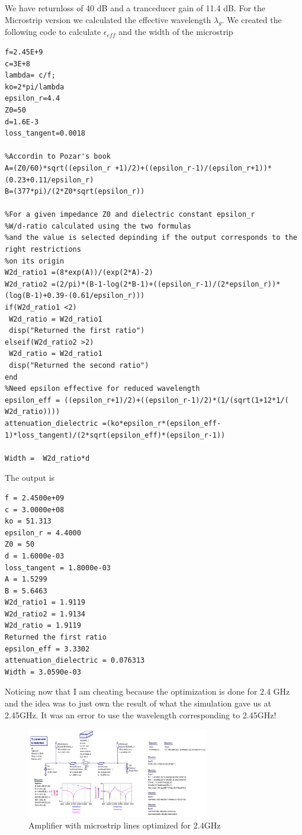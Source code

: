 \documentclass{article}
\begin{document}
We have returnloss of 40 dB and a tranceducer gain of 11.4 dB.
For the Microstrip version we calculated the effective
wavelength $\lambda_g$. We created the following code
to calculate $\epsilon_{eff}$ and the width of the microstrip
\begin{verbatim}
f=2.45E+9
c=3E+8
lambda= c/f;
ko=2*pi/lambda
epsilon_r=4.4
Z0=50
d=1.6E-3
loss_tangent=0.0018

%Accordin to Pozar's book
A=(Z0/60)*sqrt((epsilon_r +1)/2)+((epsilon_r-1)/(epsilon_r+1))*(0.23+0.11/epsilon_r)
B=(377*pi)/(2*Z0*sqrt(epsilon_r))

%For a given impedance Z0 and dielectric constant epsilon_r
%W/d-ratio calculated using the two formulas
%and the value is selected depinding if the output corresponds to the right restrictions
%on its origin
W2d_ratio1 =(8*exp(A))/(exp(2*A)-2)
W2d_ratio2 =(2/pi)*(B-1-log(2*B-1)+((epsilon_r-1)/(2*epsilon_r))*(log(B-1)+0.39-(0.61/epsilon_r)))
if(W2d_ratio1 <2)
 W2d_ratio = W2d_ratio1
 disp("Returned the first ratio")
elseif(W2d_ratio2 >2)
 W2d_ratio = W2d_ratio1
 disp("Returned the second ratio")
end
%Need epsilon effective for reduced wavelength
epsilon_eff = ((epsilon_r+1)/2)+((epsilon_r-1)/2)*(1/(sqrt(1+12*1/( W2d_ratio))))
attenuation_dielectric =(ko*epsilon_r*(epsilon_eff-1)*loss_tangent)/(2*sqrt(epsilon_eff)*(epsilon_r-1))

Width =  W2d_ratio*d
\end{verbatim}
The output is
\begin{verbatim}
f = 2.4500e+09
c = 3.0000e+08
ko = 51.313
epsilon_r = 4.4000
Z0 = 50
d = 1.6000e-03
loss_tangent = 1.8000e-03
A = 1.5299
B = 5.6463
W2d_ratio1 = 1.9119
W2d_ratio2 = 1.9134
W2d_ratio = 1.9119
Returned the first ratio
epsilon_eff = 3.3302
attenuation_dielectric = 0.076313
Width = 3.0590e-03
\end{verbatim}
Noticing now that I am cheating because the optimization is done for 2.4 GHz and
the idea was to just own the result of what the simulation gave us at 2.45GHz.
It was an error to use the wavelength corresponding to 2.45GHz!
\begin{figure}[H]
\centering
  \includegraphics[width=80mm,scale=0.5]{Amp2_4GHzMicrostripNoTee.png}
  \caption{Amplifier with microstrip lines optimized for 2.4GHz}
  \label{fig4}
\end{figure}
\end{document}

